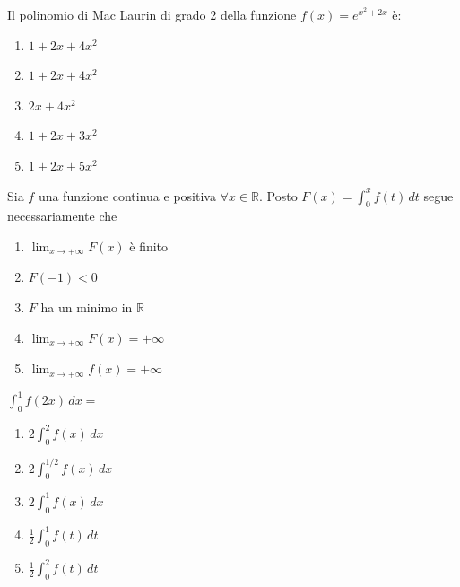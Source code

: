 \begin{quiz}
Il polinomio di Mac Laurin di grado 2 della funzione $f(x)=e^{x^2+2x}$ è:

\begin{enumerate}
\item $1+2x+4x^2$
\item $1+2x+4x^2$
\item $2x+4x^2$
\item $1+2x+3x^2$
\item $1+2x+5x^2$
\end{enumerate}
\end{quiz}

\begin{quiz}
Sia $f$ una funzione continua e positiva $\forall x\in\mathbb R$. Posto $F(x)=\displaystyle\int_0^x f(t)\,dt$ segue necessariamente che

\begin{enumerate}
\item $\lim_{x\to+\infty}F(x)$ è finito
\item $F(-1)<0$
\item $F$ ha un minimo in $\mathbb R$
\item $\lim_{x\to+\infty}F(x)=+\infty$
\item $\lim_{x\to+\infty}f(x)=+\infty$
\end{enumerate}
\end{quiz}

\begin{quiz}
$\displaystyle\int_0^1 f(2x)\,dx=$

\begin{enumerate}
\item $2\int_0^2 f(x)\,dx$
\item $2\int_0^{1/2} f(x)\,dx$
\item $2\int_0^1 f(x)\,dx$
\item $\frac12\int_0^1 f(t)\,dt$
\item $\frac12\int_0^2 f(t)\,dt$
\end{enumerate}
\end{quiz}

